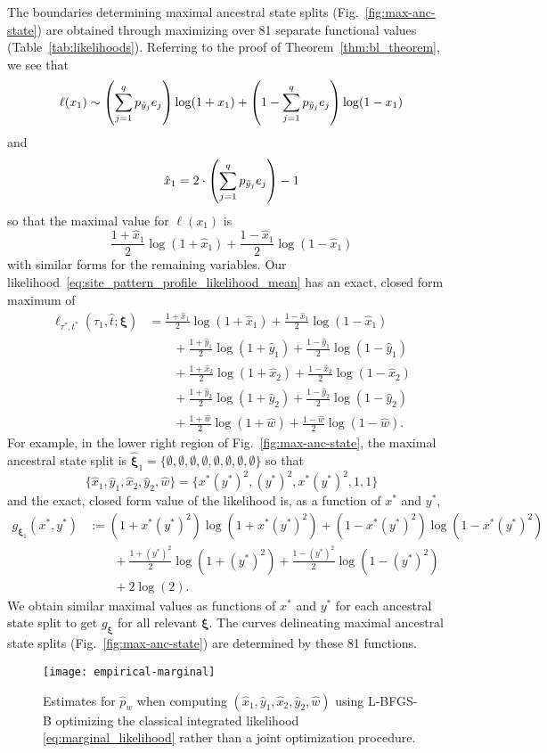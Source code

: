 The boundaries determining maximal ancestral state splits (Fig.~\ref{fig:max-anc-state}) are obtained through maximizing over 81 separate functional values (Table~\ref{tab:likelihoods}).
Referring to the proof of Theorem~\ref{thm:bl_theorem}, we see that
\[
\ell(x_1) \sim \left(\sum_{j=1}^q p_{\tilde{y}_j}e_j\right) \log(1+x_1) + \left(1-\sum_{j=1}^q p_{\tilde{y}_j}e_j\right) \log (1-x_1)
\]
and
\[
\hat{x}_1 = 2\cdot\left(\sum_{j=1}^q p_{\tilde{y}_j}e_j\right) - 1
\]
so that the maximal value for $\ell(x_1)$ is
\[
\frac{1+\hat{x}_1}{2}\log(1+\hat{x}_1) + \frac{1-\hat{x}_1}{2}\log(1-\hat{x}_1)
\]
with similar forms for the remaining variables.
Our likelihood~\eqref{eq:site_pattern_profile_likelihood_mean} has an exact, closed form maximum of
\begin{align}
\ell_{\tau^*,t^*}(\tau_1, \hat{t}; \boldsymbol\xi) &= \frac{1+\hat{x}_1}{2}\log(1+\hat{x}_1) + \frac{1-\hat{x}_1}{2}\log(1-\hat{x}_1)\nonumber\\
&\qquad + \frac{1+\hat{y}_1}{2}\log(1+\hat{y}_1) + \frac{1-\hat{y}_1}{2}\log(1-\hat{y}_1)\nonumber\\
&\qquad + \frac{1+\hat{x}_2}{2}\log(1+\hat{x}_2) + \frac{1-\hat{x}_2}{2}\log(1-\hat{x}_2)\nonumber\\
&\qquad + \frac{1+\hat{y}_2}{2}\log(1+\hat{y}_2) + \frac{1-\hat{y}_2}{2}\log(1-\hat{y}_2)\nonumber\\
&\qquad + \frac{1+\hat{w}}{2}\log(1+\hat{w}) + \frac{1-\hat{w}}{2}\log(1-\hat{w}).
\end{align}
For example, in the lower right region of Fig.~\ref{fig:max-anc-state}, the maximal ancestral state split is $\hat{\boldsymbol\xi}_1 = \{\emptyset,\emptyset,\emptyset,\emptyset,\emptyset,\emptyset,\emptyset,\emptyset\}$ so that
\[
\{\hat{x}_1,\hat{y}_1,\hat{x}_2,\hat{y}_2,\hat{w}\} = \{x^*(y^*)^2,(y^*)^2,x^*(y^*)^2,1,1\}
\]
and the exact, closed form value of the likelihood is, as a function of $x^*$ and $y^*$,
\begin{align}
g_{\boldsymbol\xi_1}(x^*,y^*) &:= (1+x^*(y^*)^2)\log(1+x^*(y^*)^2) + (1-x^*(y^*)^2)\log(1-x^*(y^*)^2)\nonumber\\
&\qquad + \frac{1+(y^*)^2}{2}\log(1+(y^*)^2) + \frac{1-(y^*)^2}{2}\log(1-(y^*)^2)\nonumber\\
&\qquad + 2\log(2).
\end{align}
We obtain similar maximal values as functions of $x^*$ and $y^*$ for each ancestral state split to get $g_{\boldsymbol\xi}$ for all relevant $\boldsymbol\xi$.
The curves delineating maximal ancestral state splits (Fig.~\ref{fig:max-anc-state}) are determined by these 81 functions.


\begin{figure}
\centering
\texttt{[image: empirical-marginal]}
\caption{
    Estimates for $\hat{p}_w$ when computing $(\hat{x}_1, \hat{y}_1, \hat{x}_2, \hat{y}_2, \hat{w})$ using L-BFGS-B optimizing the classical integrated likelihood \eqref{eq:marginal_likelihood} rather than a joint optimization procedure.
}
\label{fig:bl-general-marginal}
\end{figure}
